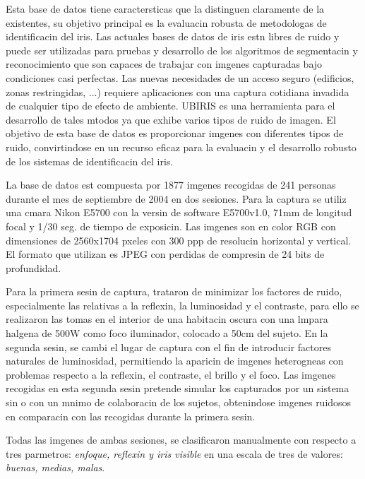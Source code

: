 \label{sec:UBIRIS_database}

Esta base de datos tiene caractersticas que la distinguen claramente de la existentes, su objetivo principal es la evaluacin robusta de metodologas de identificacin del iris. Las actuales bases de datos de iris estn libres de ruido y puede ser utilizadas para pruebas y desarrollo de los algoritmos de segmentacin y reconocimiento que son capaces de trabajar con imgenes capturadas bajo condiciones casi perfectas. Las nuevas necesidades de un acceso seguro (edificios, zonas restringidas, ...) requiere aplicaciones con una captura cotidiana invadida de cualquier tipo de efecto de ambiente. UBIRIS es una herramienta para el desarrollo de tales mtodos ya que exhibe varios tipos de ruido de imagen. El objetivo de esta base de datos es proporcionar imgenes con diferentes tipos de ruido, convirtindose en un recurso eficaz para la evaluacin y el desarrollo robusto de los sistemas de identificacin del iris.

La base de datos est compuesta por 1877 imgenes recogidas de 241 personas durante el mes de septiembre de 2004 en dos sesiones. Para la captura se utiliz una cmara Nikon E5700 con la versin de software E5700v1.0, 71mm de longitud focal y 1/30 seg. de tiempo de exposicin. Las imgenes son en color RGB con dimensiones de 2560x1704 pxeles con 300 ppp de resolucin horizontal y vertical. El formato que utilizan es JPEG con perdidas de compresin de 24 bits de profundidad.

Para la primera sesin de captura, trataron de minimizar los factores de ruido, especialmente las relativas a la reflexin, la luminosidad y el contraste, para ello se realizaron las tomas en el interior de una habitacin oscura con una lmpara halgena de 500W como foco iluminador, colocado a 50cm del sujeto. En la segunda sesin, se cambi el lugar de captura con el fin de introducir factores naturales de luminosidad, permitiendo la aparicin de imgenes heterogneas con problemas respecto a la reflexin, el contraste, el brillo y el foco. Las imgenes recogidas en esta segunda sesin pretende simular los capturados por un sistema sin o con un mnimo de colaboracin de los sujetos, obtenindose imgenes ruidosos en comparacin con las recogidas durante la primera sesin.

Todas las imgenes de ambas sesiones, se clasificaron manualmente con respecto a tres parmetros: \emph{enfoque, reflexin y iris visible} en una escala de tres de valores: \emph{buenas, medias, malas}.

